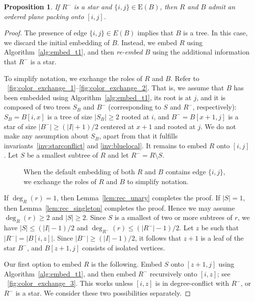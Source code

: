 \documentclass[11pt,a4paper,colorlinks=true,urlcolor=blue,citecolor=red]{article}
\theoremstyle{plain}
\newtheorem{proposition}[theorem]{Proposition}
\newcommand{\EB}{\mathrm{E}(B)}
\begin{document}
\begin{proposition}\label{prop:rec_large_red_star_ij_used}
  If $R^-$ is a star and $\{i,j\}\in\EB$, then $R$ and $B$
  admit an ordered plane packing onto $[i,j]$.
\end{proposition}
\begin{proof}
  The presence of edge $\{i,j\}\in E(B)$ implies that $B$ is a tree. In
  this case, we discard the initial embedding of $B$. Instead, we embed
  $R$ using Algorithm~\ref{alg:embed_t1}, and then \emph{re-embed} $B$
  using the additional information that $R^-$ is a star.

  To simplify notation, we exchange the roles of $R$ and $B$. Refer to
  \figurename~\ref{fig:color_exchange_1}--\ref{fig:color_exchange_2}.
  That is, we assume that $B$ has been embedded using
  Algorithm~\ref{alg:embed_t1}, its root is at $j$, and it is composed
  of two trees $S_B$ and $B^-$ (corresponding to $S$ and $R^-$,
  respectively): $S_B=B[i,x]$ is a tree of size $|S_B|\geq 2$ rooted at
  $i$, and $B^-=B[x+1,j]$ is a star of size $|B^-|\geq (|I|+1)/2$
  centered at $x+1$ and rooted at $j$. We do not make any assumption
  about $S_B$, apart from that it fulfills
  invariants~\ref{inv:starconflict} and \ref{inv:bluelocal}. It remains
  to embed $R$ onto $[i,j]$. Let $S$ be a smallest subtree of $R$ and
  let $R^-=R\setminus S$.

\begin{figure}[htbp]
  \centering\hfil {}\hfil {}\hfil {}\hfil \caption{When the default embedding of both $R$ and $B$ contains edge
    $\{i,j\}$, we exchange the roles of $R$ and $B$ to simplify
    notation.\label{fig:color_exchange}}
\end{figure}

If $\deg_R(r)=1$, then Lemma~\ref{lem:rec_unary} completes the proof. If
$|S|=1$, then Lemma~\ref{lem:rec_singleton} completes the proof. Hence
we may assume $\deg_R(r)\geq 2$ and $|S|\geq 2$. Since $S$ is a smallest
of two or more subtrees of $r$, we have $|S|\leq (|I|-1)/2$ and
$\deg_{R^-}(r)\leq (|R^-|-1)/2$. Let $z$ be such that $|R^-|=|B[i,z]|$.
Since $|B^-|\geq(|I|-1)/2$, it follows that $z+1$ is a leaf of the
star $B^-$, and $B[z+1,j]$ consists of isolated vertices.

Our first option to embed $R$ is the following. Embed $S$ onto $[z+1,j]$
using Algorithm~\ref{alg:embed_t1}, and then embed $R^-$ recursively
onto $[i,z]$; see \figurename~\ref{fig:color_exchange_3}. This works
unless $[i,z]$ is in degree-conflict with $R^-$, or $R^-$ is a star. We
consider these two possibilities separately.


\end{proof}
\end{document}
